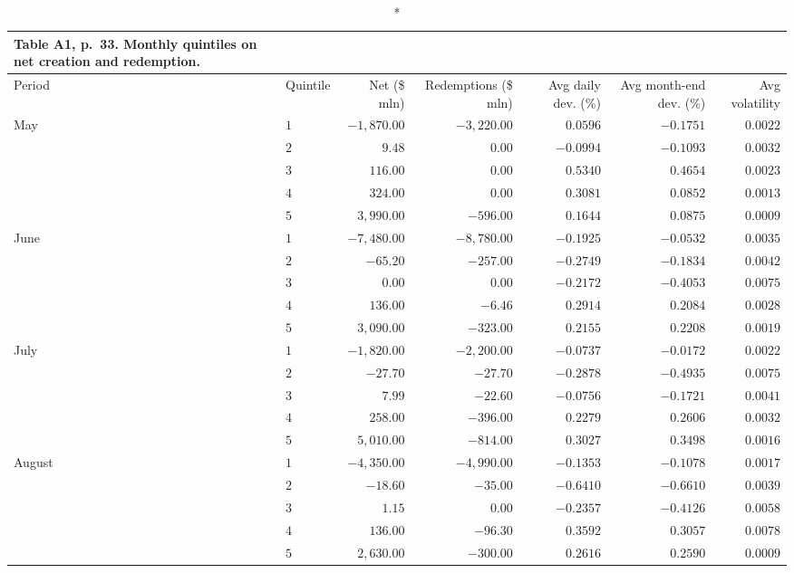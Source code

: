 \documentclass[10pt,a4paper]{article}
\begin{document}
{\scriptsize\setlength{\tabcolsep}{5pt}
\begin{longtable}{@{}llrrrrr@{}}
\caption*{\textbf{Table A1, p.~33. Monthly quintiles on net creation and redemption.}}\\
\toprule
Period & Quintile & Net (\$ mln) & Redemptions (\$ mln) & Avg daily dev. (\%) & Avg month-end dev. (\%) & Avg volatility\\
\midrule\endhead
May & $1$ & $-1{,}870.00$ & $-3{,}220.00$ & $0.0596$ & $-0.1751$ & $0.0022$\\
 & $2$ & $9.48$ & $0.00$ & $-0.0994$ & $-0.1093$ & $0.0032$\\
 & $3$ & $116.00$ & $0.00$ & $0.5340$ & $0.4654$ & $0.0023$\\
 & $4$ & $324.00$ & $0.00$ & $0.3081$ & $0.0852$ & $0.0013$\\
 & $5$ & $3{,}990.00$ & $-596.00$ & $0.1644$ & $0.0875$ & $0.0009$\\
June & $1$ & $-7{,}480.00$ & $-8{,}780.00$ & $-0.1925$ & $-0.0532$ & $0.0035$\\
 & $2$ & $-65.20$ & $-257.00$ & $-0.2749$ & $-0.1834$ & $0.0042$\\
 & $3$ & $0.00$ & $0.00$ & $-0.2172$ & $-0.4053$ & $0.0075$\\
 & $4$ & $136.00$ & $-6.46$ & $0.2914$ & $0.2084$ & $0.0028$\\
 & $5$ & $3{,}090.00$ & $-323.00$ & $0.2155$ & $0.2208$ & $0.0019$\\
July & $1$ & $-1{,}820.00$ & $-2{,}200.00$ & $-0.0737$ & $-0.0172$ & $0.0022$\\
 & $2$ & $-27.70$ & $-27.70$ & $-0.2878$ & $-0.4935$ & $0.0075$\\
 & $3$ & $7.99$ & $-22.60$ & $-0.0756$ & $-0.1721$ & $0.0041$\\
 & $4$ & $258.00$ & $-396.00$ & $0.2279$ & $0.2606$ & $0.0032$\\
 & $5$ & $5{,}010.00$ & $-814.00$ & $0.3027$ & $0.3498$ & $0.0016$\\
August & $1$ & $-4{,}350.00$ & $-4{,}990.00$ & $-0.1353$ & $-0.1078$ & $0.0017$\\
 & $2$ & $-18.60$ & $-35.00$ & $-0.6410$ & $-0.6610$ & $0.0039$\\
 & $3$ & $1.15$ & $0.00$ & $-0.2357$ & $-0.4126$ & $0.0058$\\
 & $4$ & $136.00$ & $-96.30$ & $0.3592$ & $0.3057$ & $0.0078$\\
 & $5$ & $2{,}630.00$ & $-300.00$ & $0.2616$ & $0.2590$ & $0.0009$\\
\bottomrule
\end{longtable}}
\end{document}
